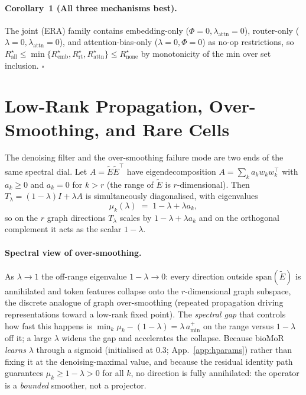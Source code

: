 \documentclass[letterpaper]{article}
\begin{document}
\paragraph{Corollary~1 (All three mechanisms best).} The joint (ERA) family contains embedding-only
($\Phi{=}0,\lambda_{\mathrm{attn}}{=}0$), router-only ($\lambda{=}0,\lambda_{\mathrm{attn}}{=}0$), and
attention-bias-only ($\lambda{=}0,\Phi{=}0$) as no-op restrictions, so
$R^\star_{\mathrm{all}}\le\min\{R^\star_{\mathrm{emb}},R^\star_{\mathrm{rt}},R^\star_{\mathrm{attn}}\}\le R^\star_{\mathrm{none}}$
by monotonicity of the min over set inclusion. $\square$

\section{Low-Rank Propagation, Over-Smoothing, and Rare Cells}
\label{app:oversmooth}
The denoising filter and the over-smoothing failure mode are two ends of the same spectral dial. Let
$A=\tilde E\tilde E^\top$ have eigendecomposition $A=\sum_k a_k w_kw_k^\top$ with $a_k\ge0$ and
$a_k{=}0$ for $k>r$ (the range of $\tilde E$ is $r$-dimensional). Then $T_\lambda=(1-\lambda)I+\lambda A$
is simultaneously diagonalised, with eigenvalues
\[
\mu_k(\lambda)\;=\;1-\lambda+\lambda a_k ,
\]
so on the $r$ graph directions $T_\lambda$ scales by $1-\lambda+\lambda a_k$ and on the orthogonal
complement it acts as the scalar $1-\lambda$.

\paragraph{Spectral view of over-smoothing.} As $\lambda\to1$ the off-range eigenvalue $1-\lambda\to0$:
every direction outside $\mathrm{span}(\tilde E)$ is annihilated and token features collapse onto the
$r$-dimensional graph subspace, the discrete analogue of graph over-smoothing (repeated propagation
driving representations toward a low-rank fixed point). The \emph{spectral gap} that controls how fast
this happens is $\min_k \mu_k - (1-\lambda) = \lambda\,a_{\min}^{+}$ on the range versus $1-\lambda$
off it; a large $\lambda$ widens the gap and accelerates the collapse. Because bioMoR \emph{learns}
$\lambda$ through a sigmoid (initialised at $0.3$; App.~\ref{app:hparams}) rather than fixing it at the
denoising-maximal value, and because the residual identity path guarantees $\mu_k\ge 1-\lambda>0$ for
all $k$, no direction is fully annihilated: the operator is a \emph{bounded} smoother, not a projector.
\end{document}
